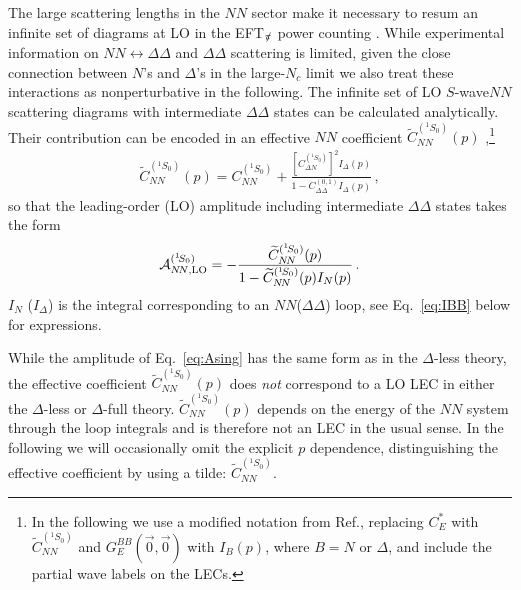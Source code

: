 \documentclass[nofootinbib, preprint, aps, prc, superscriptaddress,11pt]{revtex4-1}
\newcommand{\Nc}{\ensuremath{N_c}\xspace}
\newcommand{\NN}{\ensuremath{N\!N}\xspace}
\newcommand{\oneS}{\ensuremath{{{}^{1}\!S_0}}\xspace}
\newcommand\Swave{$S$-wave\xspace}
\newcommand{\calA}{\ensuremath{\mathcal{A}}}
\newcommand{\1}{\mathbbm{1}}
\newcommand{\CNNsing}{\ensuremath{C_{\NN}^{(^1 \! S_0)}}\xspace}
\newcommand{\CNDsing}{\ensuremath{C_{\Delta N}^{(^1 \! S_0)}}\xspace}
\newcommand{\CDDsing}{\ensuremath{C_{\Delta\Delta}^{(0,1)}}\xspace}
\newcommand{\CeffSing}{\ensuremath{\widetilde C_{\NN}^{(\oneS)}}\xspace}
\newcommand{\nopi}{\ensuremath{\pi\hskip-0.40em /}}
\newcommand{\eftnopi}{EFT$_{\nopi}$\xspace}
\newcommand{\D}{\ensuremath{\Delta}\xspace}
\newcommand{\DD}{\ensuremath{\Delta\Delta}\xspace}
\begin{document}
The large scattering lengths in the \NN sector make it necessary to resum an infinite set of diagrams at LO in the \eftnopi power counting \cite{Kaplan:1996xu,Kaplan:1998tg, Kaplan:1998we, vanKolck:1998bw}.
While experimental information on $\NN\leftrightarrow\DD$ and \DD scattering is limited, given the close connection between $N$'s and \D's in the large-\Nc limit we also treat these interactions as nonperturbative in the following.
The infinite set of LO \Swave \NN scattering diagrams with intermediate \DD states can be calculated analytically.
Their contribution can be encoded in an effective \NN coefficient $\widetilde{C}_{\NN}^{(\oneS)}(p)$ 
\cite{Savage:1996tb},\footnote{In the following we use a modified notation from Ref.{\cite{Savage:1996tb}}, replacing $C_E^{*}$ with $\CeffSing$ and $G_E^{BB}(\vec 0,\vec 0)$ with $I_{B}(p)$, where $B=N$ or \D, and include the partial wave labels on the LECs.}
\begin{align}
\label{eq:CEsing}
    \CeffSing (p) = \CNNsing + \frac{\left[\CNDsing \right]^2 I_{\D}(p)}{1-\CDDsing I_{\D}(p)} \, ,
\end{align}
so that the leading-order (LO) amplitude including intermediate \DD states takes the form 
\begin{align}
\label{eq:Asing}
    \calA_\text{\NN,LO}^{(\oneS)} = - \frac{\CeffSing(p)}{1-\CeffSing(p) I_{N}(p)}\, .
\end{align}
$I_{N}$ ($I_{\D}$) is the integral corresponding to an \NN (\DD) loop, see Eq.~\eqref{eq:IBB} below for expressions.

While the amplitude of Eq.~\eqref{eq:Asing} has the same form as in the \D-less theory, the effective coefficient $\CeffSing(p)$ does \emph{not} correspond to a LO LEC in either the \D-less or \D-full theory. $\CeffSing(p)$ depends on the energy of the \NN system through the loop integrals and is therefore not an LEC in the usual sense. In the following we will occasionally omit the explicit $p$ dependence, distinguishing the effective coefficient by using a tilde: \CeffSing.
\end{document}
